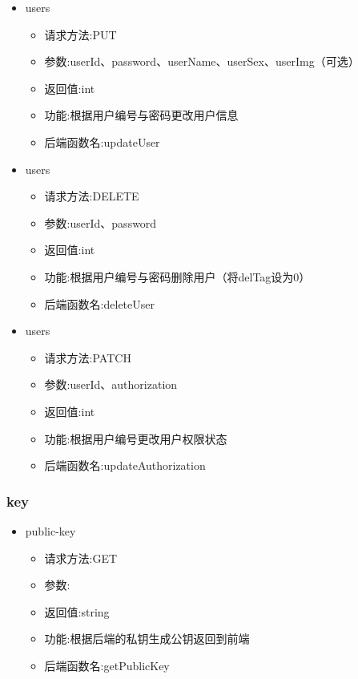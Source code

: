 \begin{itemize}
\item users
\begin{itemize}
    \item 请求方法:PUT
    \item 参数:userId、password、userName、userSex、userImg（可选）
    \item 返回值:int
    \item 功能:根据用户编号与密码更改用户信息
    \item 后端函数名:updateUser
\end{itemize}

\item users
\begin{itemize}
    \item 请求方法:DELETE
    \item 参数:userId、password
    \item 返回值:int
    \item 功能:根据用户编号与密码删除用户（将delTag设为0）
    \item 后端函数名:deleteUser
\end{itemize}

\item users
\begin{itemize}
    \item 请求方法:PATCH
    \item 参数:userId、authorization
    \item 返回值:int
    \item 功能:根据用户编号更改用户权限状态
    \item 后端函数名:updateAuthorization
\end{itemize}

\end{itemize}

\subsubsection*{key}
\begin{itemize}
  \item public-key
\begin{itemize}
    \item 请求方法:GET
    \item 参数:
    \item 返回值:string
    \item 功能:根据后端的私钥生成公钥返回到前端
    \item 后端函数名:getPublicKey
\end{itemize}
\end{itemize}


